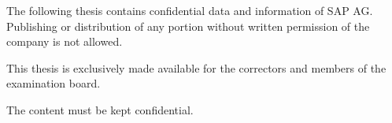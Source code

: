 
The following thesis contains confidential data and information of SAP AG. Publishing or distribution of any portion without written permission of the company is not allowed.

This thesis is exclusively made available for the correctors and members of the examination board.

The content must be kept confidential.


